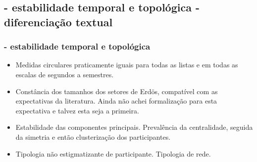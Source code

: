 \documentclass[10pt]{beamer}
\begin{document}
\subsection{- estabilidade temporal e topológica \;\; - diferenciação textual}
\begin{frame}
\frametitle{- estabilidade temporal e topológica}
\begin{itemize}
	\item Medidas circulares praticamente iguais para todas as listas e em todas as escalas de segundos a semestres.
	\item Constância dos tamanhos dos setores de Erdös, compatível com as expectativas da literatura. Ainda não achei formalização para esta expectativa e talvez esta seja a primeira.
	\item Estabilidade das componentes principais. Prevalência da centralidade, seguida da simetria e então clusterização dos participantes.
	\item Tipologia não estigmatizante de participante. Tipologia de rede.
\end{itemize}
\end{frame}
\end{document}
